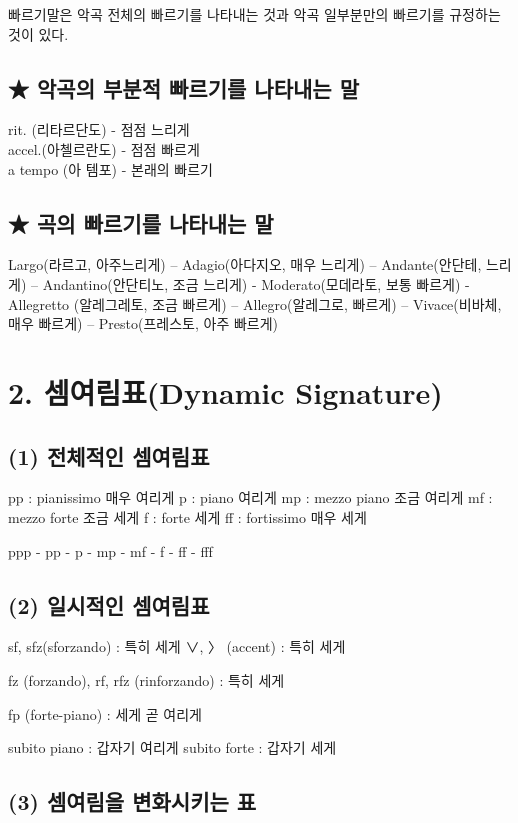 \documentclass[12pt, a4paper, oneside]{book}
\let\stdsection\section
\renewcommand\section{\newpage\stdsection}
\begin{document}
빠르기말은 악곡 전체의 빠르기를 나타내는 것과
악곡 일부분만의 빠르기를 규정하는 것이 있다.

\subsection{★ 악곡의 부분적 빠르기를 나타내는 말}
rit. (리타르단도) - 점점 느리게 \\
accel.(아첼르란도) - 점점 빠르게 \\
a tempo (아 템포) - 본래의 빠르기 \\

\subsection{★ 곡의 빠르기를 나타내는 말}
Largo(라르고, 아주느리게) – Adagio(아다지오, 매우 느리게)
– Andante(안단테, 느리게) – Andantino(안단티노, 조금
느리게) - Moderato(모데라토, 보통 빠르게) - Allegretto
(알레그레토, 조금 빠르게) – Allegro(알레그로, 빠르게) –
Vivace(비바체, 매우 빠르게) – Presto(프레스토, 아주 빠르게)


	\section{2. 셈여림표(Dynamic Signature)}

\subsection{(1) 전체적인 셈여림표}
pp : pianissimo 매우 여리게
p : piano 여리게
mp : mezzo piano 조금 여리게
mf : mezzo forte 조금 세게
f : forte 세게
ff : fortissimo 매우 세게

ppp - pp - p - mp - mf - f - ff - fff


	\subsection{(2) 일시적인 셈여림표}
sf, sfz(sforzando) : 특히 세게 ∨, 〉 (accent) : 특히 세게

fz (forzando), rf, rfz (rinforzando) : 특히 세게

fp (forte-piano) : 세게 곧 여리게

subito piano : 갑자기 여리게 subito forte : 갑자기 세게


	\subsection{(3) 셈여림을 변화시키는 표}
\end{document}

